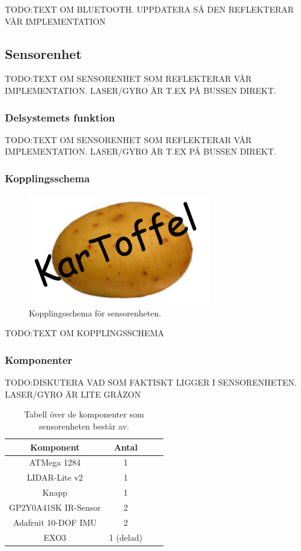 \documentclass{article}
\begin{document}
TODO:TEXT OM BLUETOOTH. UPPDATERA SÅ DEN REFLEKTERAR VÅR IMPLEMENTATION

\subsection{Sensorenhet}
TODO:TEXT OM SENSORENHET SOM REFLEKTERAR VÅR IMPLEMENTATION. LASER/GYRO ÄR T.EX PÅ BUSSEN DIREKT.

\subsubsection{Delsystemets funktion}
TODO:TEXT OM SENSORENHET SOM REFLEKTERAR VÅR IMPLEMENTATION. LASER/GYRO ÄR T.EX PÅ BUSSEN DIREKT.

\subsubsection{Kopplingsschema}
\begin{figure}[H]
\centering
\includegraphics[scale=0.6]{Logo}
\caption{Kopplingsschema för sensorenheten.}
\label{fig:sensorenhet_kopplingsschema}
\end{figure}

TODO:TEXT OM KOPPLINGSSCHEMA

\subsubsection{Komponenter}

TODO:DISKUTERA VAD SOM FAKTISKT LIGGER I SENSORENHETEN. LASER/GYRO ÄR LITE GRÅZON
\begin{table}[H]
  \centering
  \begin{tabular}{ | c | c | c | c |}
    \hline
    \textbf{Komponent} & \textbf{Antal} \\
    \hline
    ATMega 1284 & 1 \\
    \hline
    LIDAR-Lite v2 & 1 \\
    \hline
    Knapp & 1 \\
    \hline
    GP2Y0A41SK IR-Sensor & 2 \\
    \hline
    Adafruit 10-DOF IMU & 2 \\
    \hline
    EXO3 & 1 (delad) \\
    \hline
  \end{tabular}
  \caption{ Tabell över de komponenter som sensorenheten består av. }
\end{table}
\end{document}
